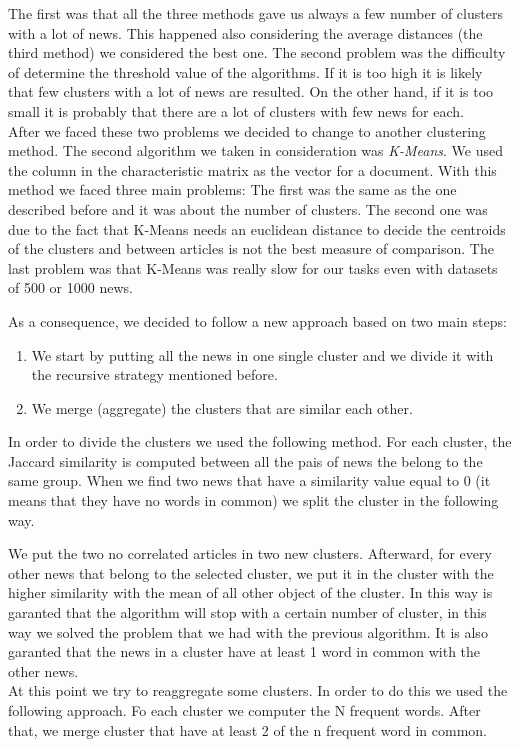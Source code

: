 \documentclass{acm_proc_article-sp}
\begin{document}
The first was that all the three methods gave us always a few number of clusters with a lot of news. This happened also considering the average distances (the third method) we considered the best one. The second problem was the difficulty of determine the threshold value of the algorithms. If it is too high it is likely that few clusters with a lot of news are resulted. On the other hand, if it is too small it is probably that there are a lot of clusters with few news for each.\\

After we faced these two problems we decided to change to another clustering method. The second algorithm we taken in consideration was \textit{K-Means}. We used the column in the characteristic matrix as the vector for a document. With this method we faced three main problems: The first was the same as the one described before and it was about the number of clusters. The second one was due to the fact that K-Means needs an euclidean distance to decide the centroids of the clusters and between articles is not the best measure of comparison. The last problem was that K-Means was really slow for our tasks even with datasets of 500 or 1000 news.

As a consequence, we decided to follow a new approach based on two main steps:
\begin{enumerate}
\item We start by putting all the news in one single cluster and we divide it with the recursive strategy mentioned before.
\item We merge (aggregate) the clusters that are similar each other.
\end{enumerate}
In order to divide the clusters we used the following method. For each cluster, the Jaccard similarity is computed between all the pais of news the belong to the same group. When we find two news that have a similarity value equal to 0 (it means that they have no words in common) we split the cluster in the following way.

We put the two no correlated articles in two new clusters. Afterward, for every other news that belong to the selected cluster, we put it in the cluster with the higher similarity with the mean of all other object of the cluster. In this way is garanted that the algorithm will stop with a certain number of cluster, in this way we solved the problem that we had with the previous algorithm. It is also garanted that the news in a cluster have at least 1 word in common with the other news.\\
At this point we try to reaggregate some clusters. In order to do this we used the following approach. Fo each cluster we computer the N frequent words. After that, we merge cluster that have at least 2 of the n frequent word in common.
\end{document}
